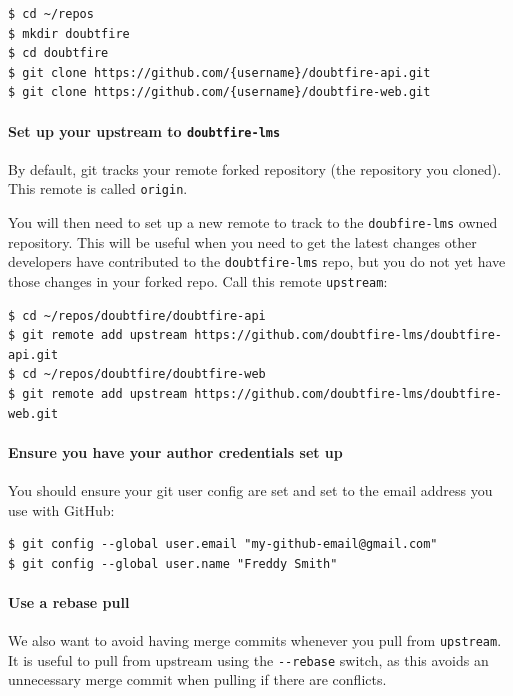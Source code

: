 \documentclass[12pt,a4paper,]{article}
\let\oldparagraph\paragraph
\renewcommand{\paragraph}[1]{\oldparagraph{#1}\mbox{}}
\begin{document}
\begin{verbatim}
$ cd ~/repos
$ mkdir doubtfire
$ cd doubtfire
$ git clone https://github.com/{username}/doubtfire-api.git
$ git clone https://github.com/{username}/doubtfire-web.git
\end{verbatim}

\paragraph{\texorpdfstring{Set up your upstream to
\texttt{doubtfire-lms}}{Set up your upstream to doubtfire-lms}}\label{set-up-your-upstream-to-doubtfire-lms}

By default, git tracks your remote forked repository (the repository you
cloned). This remote is called \texttt{origin}.

You will then need to set up a new remote to track to the
\texttt{doubfire-lms} owned repository. This will be useful when you
need to get the latest changes other developers have contributed to the
\texttt{doubtfire-lms} repo, but you do not yet have those changes in
your forked repo. Call this remote \texttt{upstream}:

\begin{verbatim}
$ cd ~/repos/doubtfire/doubtfire-api
$ git remote add upstream https://github.com/doubtfire-lms/doubtfire-api.git
$ cd ~/repos/doubtfire/doubtfire-web
$ git remote add upstream https://github.com/doubtfire-lms/doubtfire-web.git
\end{verbatim}

\paragraph{Ensure you have your author credentials set
up}\label{ensure-you-have-your-author-credentials-set-up}

You should ensure your git user config are set and set to the email
address you use with GitHub:

\begin{verbatim}
$ git config --global user.email "my-github-email@gmail.com"
$ git config --global user.name "Freddy Smith"
\end{verbatim}

\paragraph{Use a rebase pull}\label{use-a-rebase-pull}

We also want to avoid having merge commits whenever you pull from
\texttt{upstream}. It is useful to pull from upstream using the
\texttt{-\/-rebase} switch, as this avoids an unnecessary merge commit
when pulling if there are conflicts.
\end{document}
